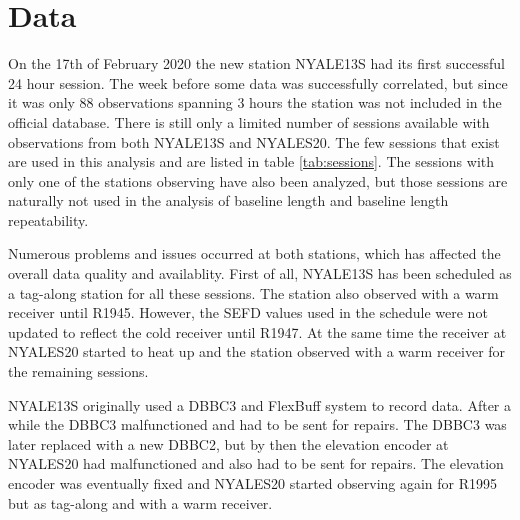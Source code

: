 \documentclass[natbib,twocolumn,twoside]{svmultiag}
\begin{document}

\section{Data}                                 
\label{sec:data}

On the 17th of February 2020 the new station NYALE13S had its first
successful 24 hour session. The week before some data was successfully correlated,
but since it was only 88 observations spanning 3 hours the station was not included 
in the official database. There is still only a limited number of sessions available 
with observations from both NYALE13S and NYALES20. The few sessions that 
exist are used in this analysis and are listed in table \ref{tab:sessions}. The sessions with only one of the
stations observing have also been analyzed, but those sessions are naturally not used in the analysis of 
baseline length and baseline length repeatability.

Numerous problems and issues occurred at both stations, which has affected the overall data
quality and availablity. First of all, NYALE13S has been scheduled as a tag-along
station for all these sessions. The station also observed with a warm receiver until R1945.
However, the SEFD values used in 
the schedule were not updated to reflect the cold receiver until R1947. At the same time the receiver
at NYALES20 started to heat up and the station observed with a warm receiver for the
remaining sessions.  

NYALE13S originally used a DBBC3 and FlexBuff system to record data. After a while the DBBC3 malfunctioned and had 
to be sent for repairs. The DBBC3 was
later replaced with a new DBBC2, but by then the elevation encoder at NYALES20 had
malfunctioned and also had to be sent for repairs. The elevation encoder was eventually fixed and
NYALES20 started observing again for R1995 but as tag-along and with a warm receiver. 
\end{document}
